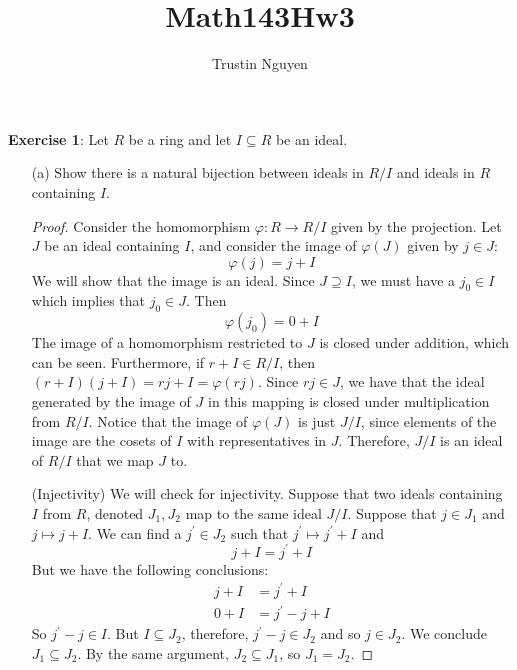 \documentclass{article}
\title{Math143Hw3}
\author{Trustin Nguyen}
\begin{document}
    \maketitle

\reversemarginpar

\textbf{Exercise 1}: Let $R$ be a ring and let $I \subseteq R$ be an ideal.
    \begin{itemize}
        \item [(a)] Show there is a natural bijection between ideals in $R/I$ and ideals in $R$ containing $I$.
            \begin{proof}
                Consider the homomorphism $\varphi : R \rightarrow R/I$ given by the projection. Let $J$ be an ideal containing $I$, and consider the image of $\varphi(J)$ given by $j \in J$:
                    \begin{equation*}
                        \varphi(j) = j + I
                    \end{equation*}
                We will show that the image is an ideal. Since $J \supseteq I$, we must have a $j_{0} \in I$ which implies that $j_{0} \in J$. Then
                    \begin{equation*}
                        \varphi(j_{0}) = 0 + I
                    \end{equation*}
                The image of a homomorphism restricted to $J$ is closed under addition, which can be seen. Furthermore, if $r + I \in R/I$, then $(r + I)(j + I) = rj + I = \varphi(rj)$. Since $rj \in J$, we have that the ideal generated by the image of $J$ in this mapping is closed under multiplication from $R/I$. Notice that the image of $\varphi(J)$ is just $J/I$, since elements of the image are the cosets of $I$ with representatives in $J$. Therefore, $J/I$ is an ideal of $R/I$ that we map $J$ to.

                (Injectivity) We will check for injectivity. Suppose that two ideals containing $I$ from $R$, denoted $J_{1}, J_{2}$ map to the same ideal $J/I$. Suppose that $j \in J_{1}$ and $j \mapsto j + I$. We can find a $j^{\prime} \in J_{2}$ such that $j^{\prime} \mapsto j^{\prime} + I$ and 
                    \begin{equation*}
                        j + I = j^{\prime} + I
                    \end{equation*}
                But we have the following conclusions:
                    \begin{align*}
                        j + I &= j^{\prime} + I     \\
                        0 + I &= j^{\prime} - j + I   
                    \end{align*}
                So $j^{\prime} - j \in I$. But $I \subseteq J_{2}$, therefore, $j^{\prime} - j \in J_{2}$ and so $j \in J_{2}$. We conclude $J_{1} \subseteq J_{2}$. By the same argument, $J_{2} \subseteq J_{1}$, so $J_{1} = J_{2}$.


\end{proof}
\end{itemize}
\end{document}
